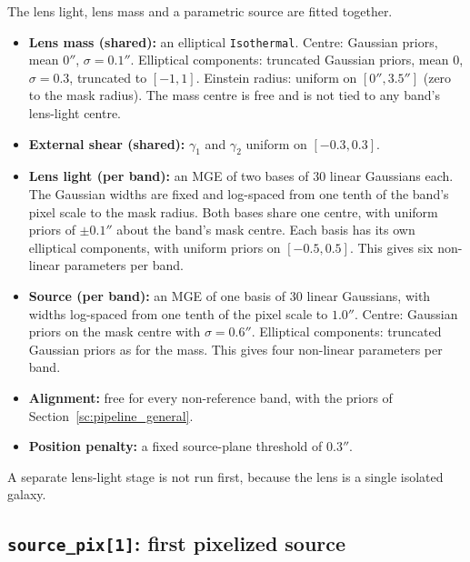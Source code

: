 The lens light, lens mass and a parametric source are fitted together.
\begin{itemize}
    \item \textbf{Lens mass (shared):} an elliptical \texttt{Isothermal}. Centre: Gaussian priors,
    mean $0''$, $\sigma = 0.1''$. Elliptical components: truncated Gaussian priors, mean 0,
    $\sigma = 0.3$, truncated to $[-1, 1]$. Einstein radius: uniform on $[0'', 3.5'']$ (zero to the
    mask radius). The mass centre is free and is not tied to any band's lens-light centre.
    \item \textbf{External shear (shared):} $\gamma_1$ and $\gamma_2$ uniform on $[-0.3, 0.3]$.
    \item \textbf{Lens light (per band):} an MGE of two bases of 30 linear Gaussians each. The
    Gaussian widths are fixed and log-spaced from one tenth of the band's pixel scale to the mask
    radius. Both bases share one centre, with uniform priors of $\pm 0.1''$ about the band's mask
    centre. Each basis has its own elliptical components, with uniform priors on $[-0.5, 0.5]$. This
    gives six non-linear parameters per band.
    \item \textbf{Source (per band):} an MGE of one basis of 30 linear Gaussians, with widths
    log-spaced from one tenth of the pixel scale to $1.0''$. Centre: Gaussian priors on the mask
    centre with $\sigma = 0.6''$. Elliptical components: truncated Gaussian priors as for the mass.
    This gives four non-linear parameters per band.
    \item \textbf{Alignment:} free for every non-reference band, with the priors of
    Section~\ref{sc:pipeline_general}.
    \item \textbf{Position penalty:} a fixed source-plane threshold of $0.3''$.
\end{itemize}
A separate lens-light stage is not run first, because the lens is a single isolated galaxy.

\subsection{\label{sc:pipeline_source_pix_1}\texttt{source\_pix[1]}: first pixelized source}

